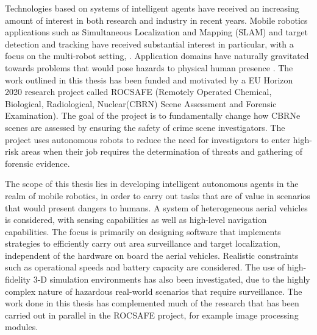 
Technologies based on systems of intelligent agents have received an increasing amount of interest in both research and industry in recent years. Mobile robotics applications such as Simultaneous Localization and Mapping (SLAM)\cite{Thrun:2005:ProbabilisticRobotics} and target detection and tracking have received substantial interest in particular, with a focus on the multi-robot setting\cite{Saeedi2016Multiple-RobotReview}, \cite{Robin2016Multi-robotSurvey}. 
Application domains have naturally gravitated towards problems that would pose hazards to physical human presence \cite{Muller2014ApplicationSurvey}. The work outlined in this thesis has been funded and motivated by a EU Horizon 2020 research project called ROCSAFE (Remotely Operated Chemical, Biological, Radiological, Nuclear(CBRN) Scene Assessment and Forensic Examination)\cite{Bagherzadeh2017ROCSAFE:Incidents}. The goal of the project is to fundamentally change how CBRNe scenes are assessed by ensuring the safety of crime scene investigators. The project uses autonomous robots to reduce the need for investigators to enter high-risk areas when their job requires the determination of threats and gathering of  forensic evidence.\par

The scope of this thesis lies in developing intelligent autonomous agents in the realm of mobile robotics, in order to carry out tasks that are of value in scenarios that would present dangers to humans. A system of heterogeneous aerial vehicles is considered, with sensing capabilities as well as high-level navigation capabilities. The focus is primarily on designing software that implements strategies to efficiently carry out area surveillance and target localization, independent of the hardware on board the aerial vehicles. Realistic constraints such as operational speeds and battery capacity are considered. The use of high-fidelity 3-D simulation environments has also been investigated, due to the highly complex nature of hazardous real-world scenarios that require surveillance. The work done in this thesis has complemented much of the research that has been carried out in parallel in the ROCSAFE project, for example image processing modules.\par